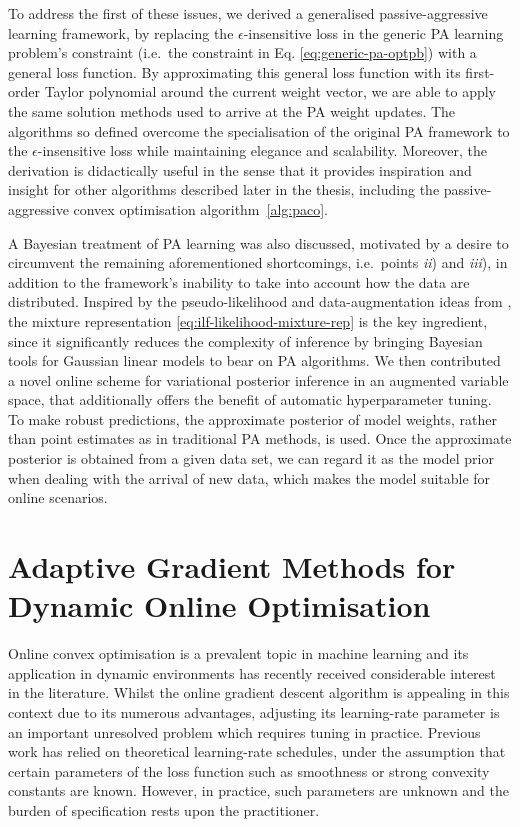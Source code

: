 To address the first of these issues, we derived a generalised passive-aggressive learning framework, by replacing the $\epsilon$-insensitive loss in the generic PA learning problem's constraint (i.e.\ the constraint in Eq. \eqref{eq:generic-pa-optpb}) with a general loss function. By approximating this general loss function with its first-order Taylor polynomial around the current weight vector, we are able to apply the same solution methods used to arrive at the PA weight updates. The algorithms so defined overcome the specialisation of the original PA framework to the $\epsilon$-insensitive loss while maintaining elegance and scalability. Moreover, the derivation is didactically useful in the sense that it provides inspiration and insight for other algorithms described later in the thesis, including the passive-aggressive convex optimisation algorithm~\ref{alg:paco}.

A Bayesian treatment of PA learning was also discussed, motivated by a desire to circumvent the remaining aforementioned shortcomings, i.e.\ points \textit{ii}) and \textit{iii}), in addition to the framework's inability to take into account how the data are distributed. Inspired by the pseudo-likelihood and data-augmentation ideas from \citep{polson&scott}, the mixture representation \eqref{eq:ilf-likelihood-mixture-rep} is the key ingredient, since it significantly reduces the complexity of inference by bringing Bayesian tools for Gaussian linear models to bear on PA algorithms. We then contributed a novel online scheme for variational posterior inference in an augmented variable space, that additionally offers the benefit of automatic hyperparameter tuning. To make robust predictions, the approximate posterior of model weights, rather than point estimates as in traditional PA methods, is used. Once the approximate posterior is obtained from a given data set, we can regard it as the model prior when dealing with the arrival of new data, which makes the model suitable for online scenarios. 


\section{Adaptive Gradient Methods for Dynamic Online Optimisation}

Online convex optimisation is a prevalent topic in machine learning and its application in dynamic environments has recently received considerable interest in the literature. Whilst the online gradient descent algorithm is appealing in this context due to its numerous advantages, adjusting its learning-rate parameter is an important unresolved problem which requires tuning in practice. Previous work has relied on theoretical learning-rate schedules, under the assumption that certain parameters of the loss function such as smoothness or strong convexity constants are known. However, in practice, such parameters are unknown and the burden of specification rests upon the practitioner.

